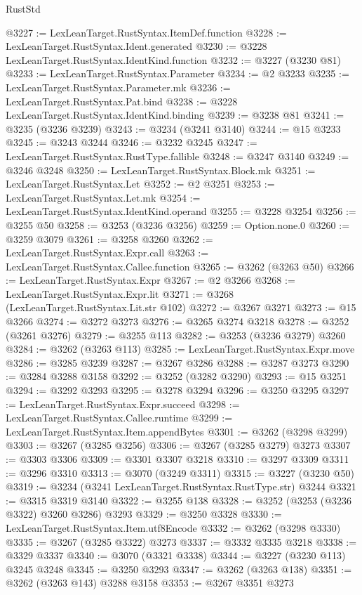 \begin{lexlean}{RustStd}
\begin{coremodule}
{\begin{coremodule}
{{{{{{{{{{{{{{{{{{{{{{{{{{{{{{{{{{{{{{{@3227 := LexLeanTarget.RustSyntax.ItemDef.function
@3228 := LexLeanTarget.RustSyntax.Ident.generated
@3230 := @3228 LexLeanTarget.RustSyntax.IdentKind.function
@3232 := @3227 (@3230 @81)
@3233 := LexLeanTarget.RustSyntax.Parameter
@3234 := @2 @3233
@3235 := LexLeanTarget.RustSyntax.Parameter.mk
@3236 := LexLeanTarget.RustSyntax.Pat.bind
@3238 := @3228 LexLeanTarget.RustSyntax.IdentKind.binding
@3239 := @3238 @81
@3241 := @3235 (@3236 @3239)
@3243 := @3234 (@3241 @3140)
@3244 := @15 @3233
@3245 := @3243 @3244
@3246 := @3232 @3245
@3247 := LexLeanTarget.RustSyntax.RustType.fallible
@3248 := @3247 @3140
@3249 := @3246 @3248
@3250 := LexLeanTarget.RustSyntax.Block.mk
@3251 := LexLeanTarget.RustSyntax.Let
@3252 := @2 @3251
@3253 := LexLeanTarget.RustSyntax.Let.mk
@3254 := LexLeanTarget.RustSyntax.IdentKind.operand
@3255 := @3228 @3254
@3256 := @3255 @50
@3258 := @3253 (@3236 @3256)
@3259 := Option.none.{0}
@3260 := @3259 @3079
@3261 := @3258 @3260
@3262 := LexLeanTarget.RustSyntax.Expr.call
@3263 := LexLeanTarget.RustSyntax.Callee.function
@3265 := @3262 (@3263 @50)
@3266 := LexLeanTarget.RustSyntax.Expr
@3267 := @2 @3266
@3268 := LexLeanTarget.RustSyntax.Expr.lit
@3271 := @3268 (LexLeanTarget.RustSyntax.Lit.str @102)
@3272 := @3267 @3271
@3273 := @15 @3266
@3274 := @3272 @3273
@3276 := @3265 @3274 @3218
@3278 := @3252 (@3261 @3276)
@3279 := @3255 @113
@3282 := @3253 (@3236 @3279) @3260
@3284 := @3262 (@3263 @113)
@3285 := LexLeanTarget.RustSyntax.Expr.move
@3286 := @3285 @3239
@3287 := @3267 @3286
@3288 := @3287 @3273
@3290 := @3284 @3288 @3158
@3292 := @3252 (@3282 @3290)
@3293 := @15 @3251
@3294 := @3292 @3293
@3295 := @3278 @3294
@3296 := @3250 @3295
@3297 := LexLeanTarget.RustSyntax.Expr.succeed
@3298 := LexLeanTarget.RustSyntax.Callee.runtime
@3299 := LexLeanTarget.RustSyntax.Item.appendBytes
@3301 := @3262 (@3298 @3299)
@3303 := @3267 (@3285 @3256)
@3306 := @3267 (@3285 @3279) @3273
@3307 := @3303 @3306
@3309 := @3301 @3307 @3218
@3310 := @3297 @3309
@3311 := @3296 @3310
@3313 := @3070 (@3249 @3311)
@3315 := @3227 (@3230 @50)
@3319 := @3234 (@3241 LexLeanTarget.RustSyntax.RustType.str) @3244
@3321 := @3315 @3319 @3140
@3322 := @3255 @138
@3328 := @3252 (@3253 (@3236 @3322) @3260 @3286) @3293
@3329 := @3250 @3328
@3330 := LexLeanTarget.RustSyntax.Item.utf8Encode
@3332 := @3262 (@3298 @3330)
@3335 := @3267 (@3285 @3322) @3273
@3337 := @3332 @3335 @3218
@3338 := @3329 @3337
@3340 := @3070 (@3321 @3338)
@3344 := @3227 (@3230 @113) @3245 @3248
@3345 := @3250 @3293
@3347 := @3262 (@3263 @138)
@3351 := @3262 (@3263 @143) @3288 @3158
@3353 := @3267 @3351 @3273
}}}}}}}}}}}}}}}}}}}}}}}}}}}}}}}}}}}}}}}
\end{coremodule}}
\end{coremodule}
\end{lexlean}
